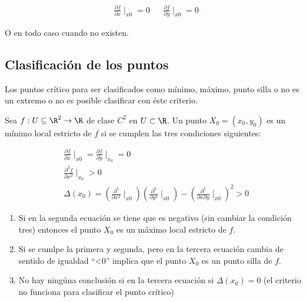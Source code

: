 \begin{align*}
	 & \frac{\partial f}{\partial x}\mid_{x0}=0 &  & \frac{\partial f}{\partial y}\mid_{x0}=0
\end{align*}

O en todo caso cuando no existen.

\subsection{Clasificación de los puntos}

Los puntos crítico para ser clasificados como mínimo, máximo, punto silla
o no es un extremo o no es posible clasificar con éste criterio.

\begin{theorem}
	Sea $f:U\subseteq \R^2\to \R$ de clase $C^2$ en $U\subset \R$. Un punto
	$X_0=\left(x_0,y_0\right)$ es un mínimo local estricto de $f$ si se cumplen las tres condiciones siguientes:

	\begin{align}
		 & \frac{\partial f}{\partial x}\mid_{x0}=\frac{\partial f}{\partial y}\mid_{x_0}=0                                                                                                          \\
		 & \frac{\partial^2 f}{\partial x^2}\mid_{x_0}>0                                                                                                                                             \\
		 & \Delta (x_0)=\left(\frac{\partial^2}{\partial x^2}\mid_{x0}\right)\left(\frac{\partial^2}{\partial y^2}\mid_{x0}\right)-\left(\frac{\partial^2}{\partial x\partial y}\mid_{x0}\right)^2>0
	\end{align}
\end{theorem}

\begin{enumerate}
	\item Si en la segunda ecuación se tiene que es negativo (sin cambiar la condición tres) entonces el punto $X_0$ es un máximo local estricto de $f$.
	\item Si se cumlpe la primera y segunda, pero en la tercera ecuación cambia de sentido de igualdad ``<0'' implica que
	      el punto $X_0$ es un punto silla de $f$.
	\item No hay ningúna conclusión si en la tercera ecuación si $\Delta(x_0)=0$ (el criterio no funciona para clasificar el punto crítico)
\end{enumerate}

